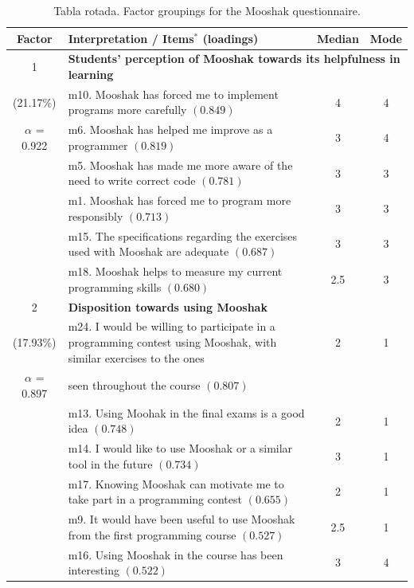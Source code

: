 \documentclass[twoside]{urjc-tfg}
\begin{document}
\begin{table}
  \centering
  \caption{Tabla rotada. Factor groupings for the Mooshak questionnaire.}\label{tab:factor_analysis}

\renewcommand{\arraystretch}{1.1}
\begin{scriptsize}
 \begin{tabular}{clcc}
   \hline
   Factor & \textbf{Interpretation} / Items$^{*}$ (loadings)  & Median & Mode \\
   \hline
   \hline
    1 & \multicolumn{3}{l}{\textbf{Students' perception of Mooshak towards its helpfulness in learning} } \\
   \hline
    (21.17\%) & m10. Mooshak has forced me to implement programs more carefully $(0.849)$ & 4 & 4 \\
    $\alpha$ = 0.922 & m6.  Mooshak has helped me improve as a programmer $(0.819)$ & 3 & 4 \\
     & m5.  Mooshak has made me more aware of the need to write correct code $(0.781)$ & 3 & 3\\
     & m1. Mooshak has forced me to program more responsibly $(0.713)$ & 3 & 3 \\
     & m15. The specifications regarding the exercises used with Mooshak are adequate $(0.687)$ & 3 & 3 \\
     & m18. Mooshak helps to measure my current programming skills $(0.680)$ & 2.5 & 3 \\
   \hline
    2 & \multicolumn{3}{l}{\textbf{Disposition towards using Mooshak} } \\
   \hline
    (17.93\%) & m24. I would be willing to participate in a programming contest using Mooshak, with similar exercises to the ones & 2 & 1 \\
    $\alpha$ = 0.897 & seen throughout the course $(0.807)$ & & \\
    & m13. Using Moohak in the final exams is a good idea $(0.748)$ & 2 & 1 \\
    & m14. I would like to use Mooshak or a similar tool in the future $(0.734)$ & 3 & 1 \\
    & m17. Knowing Mooshak can motivate me to take part in a programming contest $(0.655)$ & 2 & 1\\
    & m9. It would have been useful to use Mooshak from the first programming course $(0.527)$ & 2.5 & 1\\
     & m16. Using Mooshak in the course has been interesting $(0.522)$ & 3 & 4 \\

\end{tabular}
\end{scriptsize}
\end{table}
\end{document}
